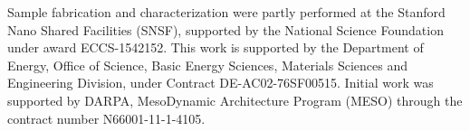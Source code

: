 Sample fabrication and characterization were partly performed at the Stanford Nano Shared Facilities (SNSF), supported by the National Science Foundation under award ECCS-1542152.  This work is supported by the Department of Energy,  Office of Science, Basic Energy Sciences, Materials Sciences and Engineering Division, under Contract DE-AC02-76SF00515. Initial work was supported by DARPA, MesoDynamic Architecture Program (MESO) through the contract number N66001-11-1-4105.